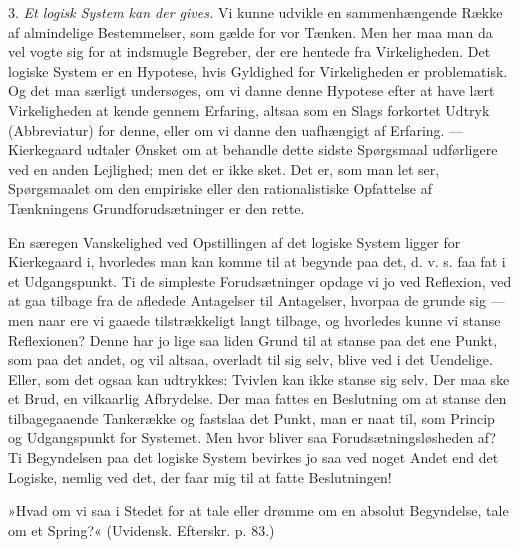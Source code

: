 \documentclass[12pt,a4paper,openany]{book}
\newcommand{\opage}[1]{\marginnote{\footnotesize\textit{[#1]}}}
\begin{document}
3. \textit{Et logisk System kan der gives.} Vi kunne udvikle
en sammenhængende Række af almindelige Bestemmelser,
som gælde for vor Tænken. Men her maa man
da vel vogte sig for at indsmugle Begreber, der ere
hentede fra Virkeligheden. Det logiske System er en
Hypotese, hvis Gyldighed for Virkeligheden er problematisk.
Og det maa særligt undersøges, om vi danne
\opage{61}denne Hypotese efter at have lært Virkeligheden at kende
gennem Erfaring, altsaa som en Slags forkortet Udtryk
(Abbreviatur) for denne, eller om vi danne den uafhængigt
af Erfaring. --- Kierkegaard udtaler Ønsket om at
behandle dette sidste Spørgsmaal udførligere ved en anden
Lejlighed; men det er ikke sket. Det er, som man let ser,
Spørgsmaalet om den empiriske eller den rationalistiske
Opfattelse af Tænkningens Grundforudsætninger er den
rette.

En særegen Vanskelighed ved Opstillingen af det
logiske System ligger for Kierkegaard i, hvorledes man
kan komme til at begynde paa det, d. v. s. faa fat i et
Udgangspunkt. Ti de simpleste Forudsætninger opdage
vi jo ved Reflexion, ved at gaa tilbage fra de afledede
Antagelser til Antagelser, hvorpaa de grunde sig --- men
naar ere vi gaaede tilstrækkeligt langt tilbage, og hvorledes
kunne vi stanse Reflexionen? Denne har jo lige
saa liden Grund til at stanse paa det ene Punkt, som
paa det andet, og vil altsaa, overladt til sig selv, blive
ved i det Uendelige. Eller, som det ogsaa kan udtrykkes:
Tvivlen kan ikke stanse sig selv. Der maa ske et Brud,
en vilkaarlig Afbrydelse. Der maa fattes en Beslutning
om at stanse den tilbagegaaende Tankerække og fastslaa
det Punkt, man er naat til, som Princip og Udgangspunkt
for Systemet. Men hvor bliver saa Forudsætningsløsheden
af? Ti Begyndelsen paa det logiske
System bevirkes jo saa ved noget Andet end det Logiske,
nemlig ved det, der faar mig til at fatte Beslutningen!

»Hvad om vi saa i Stedet for at tale eller drømme
om en absolut Begyndelse, tale om et Spring?« (Uvidensk.
Efterskr. p. 83.)
\end{document}
